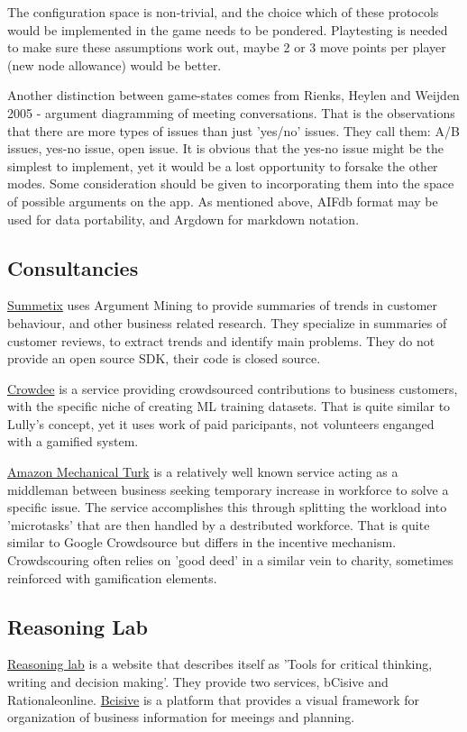 \documentclass{article}
\begin{document}
The configuration space is non-trivial, and the choice which of these protocols would be implemented in the game needs to be pondered.
Playtesting is needed to make sure these assumptions work out, maybe 2 or 3 move points per player (new node allowance) would be better.

Another distinction between game-states comes from Rienks, Heylen and Weijden 2005 - argument diagramming of meeting conversations.
That is the observations that there are more types of issues than just 'yes/no' issues.
They call them: A/B issues, yes-no issue, open issue.
It is obvious that the yes-no issue might be the simplest to implement, yet it would be a lost opportunity to forsake the other modes.
Some consideration should be given to incorporating them into the space of possible arguments on the app.
As mentioned above, AIFdb format may be used for data portability, and Argdown for markdown notation.

\subsection{Consultancies}
\href{https://www.summetix.com/}{Summetix} uses Argument Mining to provide summaries of trends in customer behaviour, and other business related research. They specialize in summaries of customer reviews, to extract trends and identify main problems. They do not provide an open source SDK, their code is closed source.

\href{https://www.crowdee.com/}{Crowdee} is a service providing crowdsourced contributions to business customers, with the specific niche of creating ML training datasets. That is quite similar to Lully's concept, yet it uses work of paid paricipants, not volunteers enganged with a gamified system.

\href{https://www.mturk.com/}{Amazon Mechanical Turk} is a relatively well known service acting as a middleman between business seeking temporary increase in workforce to solve a specific issue.
The service accomplishes this through splitting the workload into 'microtasks' that are then handled by a destributed workforce. That is quite similar to Google Crowdsource but differs in the incentive mechanism. Crowdscouring often relies on 'good deed' in a similar vein to charity, sometimes reinforced with gamification elements.

\subsection{Reasoning Lab}
\href{https://www.reasoninglab.com/argument-mapping/}{Reasoning lab} is a website that describes itself as 'Tools for critical thinking, writing and decision making'. They provide two services, bCisive and Rationaleonline.
\href{https://www.reasoninglab.com/bcisive-2/}{Bcisive} is a platform that provides a visual framework for organization of business information for meeings and planning.
\end{document}
